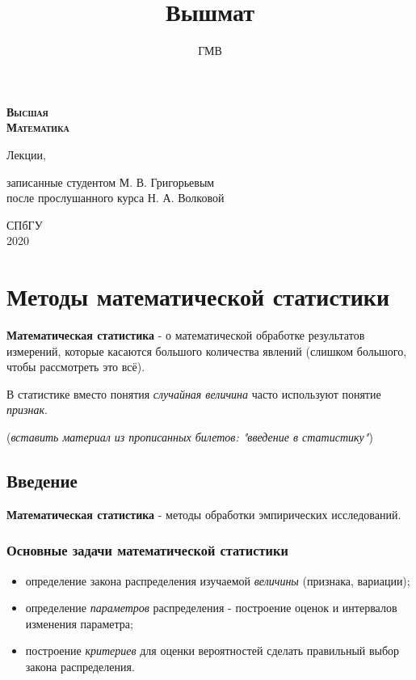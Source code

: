 \documentclass[12pt, a4paper]{article}
\author{ГМВ}
\title{Вышмат}
\begin{document}
\thispagestyle{empty}


\vspace*{63mm}
\begin{center}
{\fontsize{80}{90}\selectfont \textbf{\textsc{Высшая \\ Математика}}} \\

\vspace{5mm}

{\Large Лекции,} \\

\vspace{5mm}

записанные студентом М. В. Григорьевым \\ после прослушанного курса Н. А. Волковой

\vspace{5mm}

СПбГУ \\
2020
\end{center}
\vspace*{\fill}

\newpage\clearpage{}

\tableofcontents

\newpage

\section{Методы математической статистики}

\textbf{Математическая статистика} - о математической обработке результатов измерений, которые касаются большого количества явлений (слишком большого, чтобы рассмотреть это всё).

В статистике вместо понятия \textit{случайная величина} часто используют понятие \textit{признак}.

(\textit{вставить материал из прописанных билетов: "введение в статистику"})

\subsection{Введение}

\textbf{Математическая статистика} - методы обработки эмпирических исследований.

\subsubsection{Основные задачи математической статистики}
\begin{itemize}
 \item определение закона распределения изучаемой \textit{величины} (признака, вариации);
 \item определение \textit{параметров} распределения - построение оценок и интервалов изменения параметра;
 \item построение \textit{критериев} для оценки вероятностей сделать правильный выбор закона распределения.
\end{itemize}
\end{document}
